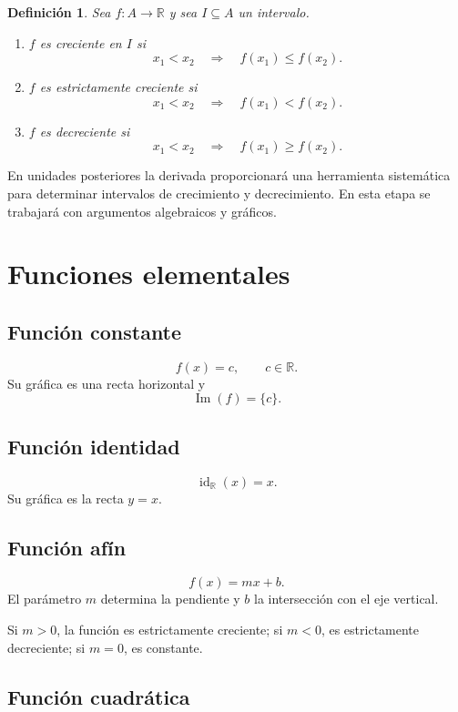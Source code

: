 \documentclass[12pt]{article}
\newtheorem{definicion}{Definición}[section]
\theoremstyle{remark}
\newcommand{\R}{\mathbb{R}}
\newcommand{\Ima}{\operatorname{Im}}
\newcommand{\id}{\operatorname{id}}
\begin{document}
\begin{definicion}
Sea $f:A\to\R$ y sea $I\subseteq A$ un intervalo.

\begin{enumerate}
    \item $f$ es \emph{creciente} en $I$ si
    \[
    x_1<x_2\quad\Longrightarrow\quad f(x_1)\leq f(x_2).
    \]
    \item $f$ es \emph{estrictamente creciente} si
    \[
    x_1<x_2\quad\Longrightarrow\quad f(x_1)<f(x_2).
    \]
    \item $f$ es \emph{decreciente} si
    \[
    x_1<x_2\quad\Longrightarrow\quad f(x_1)\geq f(x_2).
    \]
\end{enumerate}
\end{definicion}

En unidades posteriores la derivada proporcionará una herramienta sistemática
para determinar intervalos de crecimiento y decrecimiento. En esta etapa se
trabajará con argumentos algebraicos y gráficos.

\section{Funciones elementales}

\subsection{Función constante}

\[
f(x)=c,\qquad c\in\R.
\]
Su gráfica es una recta horizontal y
\[
\Ima(f)=\{c\}.
\]

\subsection{Función identidad}

\[
\id_{\R}(x)=x.
\]
Su gráfica es la recta $y=x$.

\subsection{Función afín}

\[
f(x)=mx+b.
\]
El parámetro $m$ determina la pendiente y $b$ la intersección con el eje
vertical.

Si $m>0$, la función es estrictamente creciente; si $m<0$, es estrictamente
decreciente; si $m=0$, es constante.

\subsection{Función cuadrática}
\end{document}
